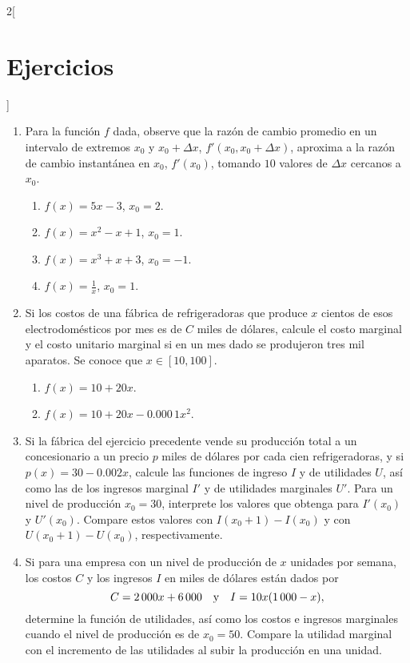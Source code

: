 \begin{multicols}{2}[\section{Ejercicios}]
\begin{enumerate}[leftmargin=*]
\item Para la función $f$ dada, observe que la razón de cambio promedio en un intervalo de
    extremos $x_0$ y $x_0 + \Delta x$, $f'(x_0, x_0 + \Delta x)$, aproxima a la razón de cambio
    instantánea en $x_0$, $f'(x_0)$, tomando $10$ valores de $\Delta x$ cercanos a $x_0$.
    \begin{enumerate}[leftmargin=*]
    \item $\displaystyle f(x) = 5x - 3$, $x_0 = 2$.
    \item $\displaystyle f(x) = x^2 - x + 1$, $x_0 = 1$.
    \item $\displaystyle f(x) = x^3 + x + 3$, $x_0 = -1$.
    \item $\displaystyle f(x) = \frac{1}{x}$, $x_0 = 1$.
    \end{enumerate}

\item Si los costos de una fábrica de refrigeradoras que produce $x$ cientos de esos
    electrodomésticos por mes es de $C$ miles de dólares, calcule el costo marginal y el costo
    unitario marginal si en un mes dado se produjeron tres mil aparatos. Se conoce que $x \in
    [10,100]$.
    \begin{enumerate}[leftmargin=*]
    \item $f(x) = 10 + 20x$.
    \item $f(x) = 10 + 20x - 0.000\, 1x^2$.
    \end{enumerate}

\item Si la fábrica del ejercicio precedente vende su producción total a un concesionario a un
    precio $p$ miles de dólares por cada cien refrigeradoras, y si $p(x) = 30 - 0.002x$,
    calcule las funciones de ingreso $I$ y de utilidades $U$, así como las de los ingresos
    marginal $I'$ y de utilidades marginales $U'$. Para un nivel de producción $x_0 = 30$,
    interprete los valores que obtenga para $I'(x_0)$ y $U'(x_0)$. Compare estos valores con
    $I(x_0 + 1) - I(x_0)$ y con $U(x_0 + 1) - U(x_0)$, respectivamente.

\item Si para una empresa con un nivel de producción de $x$ unidades por semana, los costos $C$
    y los ingresos $I$ en miles de dólares están dados por
    \[
      C = 2\,000 x + 6\,000 \quad\text{y}\quad I = 10x(1\,000 - x),
    \]
    determine la función de utilidades, así como los costos e ingresos marginales cuando el
    nivel de producción es de $x_0 = 50$. Compare la utilidad marginal con el incremento de las
    utilidades al subir la producción en una unidad.


\end{enumerate}
\end{multicols}
